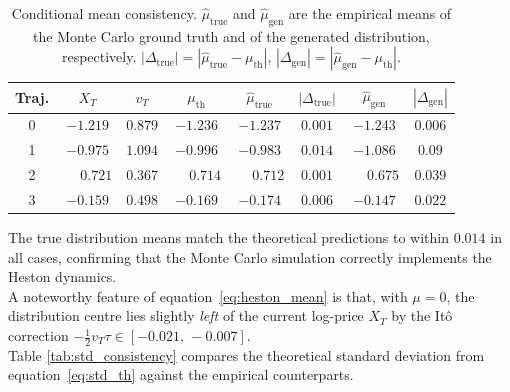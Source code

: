 \begin{table}[H]
\centering
\caption{Conditional mean consistency.  $\hat{\mu}_{\mathrm{true}}$ and
$\hat{\mu}_{\mathrm{gen}}$ are the empirical means of the Monte Carlo ground
truth and of the generated distribution, respectively.
$|\Delta_{\mathrm{true}}|=|\hat{\mu}_{\mathrm{true}}-\mu_{\mathrm{th}}|$,
$|\Delta_{\mathrm{gen}}|=|\hat{\mu}_{\mathrm{gen}}-\mu_{\mathrm{th}}|$.}
\label{tab:mean_consistency}
\begin{tabular}{cccccccc}
\toprule
Traj. & $X_T$ & $v_T$ & $\mu_{\mathrm{th}}$
      & $\hat{\mu}_{\mathrm{true}}$ & $|\Delta_{\mathrm{true}}|$
      & $\hat{\mu}_{\mathrm{gen}}$\phantom{$|$}
      & $|\Delta_{\mathrm{gen}}|$ \\
\midrule
0 & $-1.219$ & $0.879$ & $-1.236$ & $-1.237$ & $0.001$ & $-1.243$ & $0.006$\\
1 & $-0.975$ & $1.094$ & $-0.996$ & $-0.983$ & $0.014$ & $-1.086$ & $0.09$\\
2 & $\phantom{-}0.721$ & $0.367$  & $\phantom{-}0.714$ & $\phantom{-}0.712$ & $0.001$ & $\phantom{-}0.675$ & $0.039$ \\
3 & $-0.159$ & $0.498$ & $-0.169$ & $-0.174$ & $0.006$ & $-0.147$ & $0.022$\\
\bottomrule
\end{tabular}
\end{table}

The true distribution means match the theoretical predictions to within
$0.014$ in all cases, confirming that the Monte Carlo simulation correctly
implements the Heston dynamics.\\
A noteworthy feature of equation~\eqref{eq:heston_mean} is that, with $\mu=0$,
the distribution centre lies slightly \emph{left} of the current log-price
$X_T$ by the It\^{o} correction $-\tfrac{1}{2}v_T\tau \in [-0.021,\,-0.007]$.\\


Table \ref{tab:std_consistency} compares the theoretical standard deviation
from equation~\eqref{eq:std_th} against the empirical counterparts.

